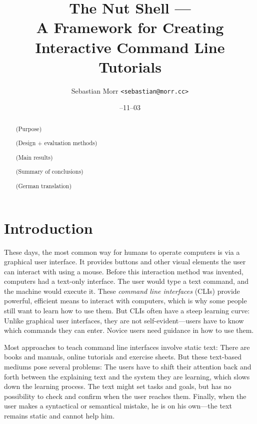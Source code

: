 \documentclass[paper=a4,twoside,abstract=on,cleardoublepage=empty,numbers=noenddot,toc=bib,12pt,appendixprefix=true]{scrreprt}
\title{The Nut Shell ---\\A Framework for Creating\\Interactive Command Line Tutorials}
\author{\sffamily Sebastian Morr \texttt{<sebastian@morr.cc>}}
\date{\sffamily 2013--11--03}
\begin{document}
\maketitle
\restoregeometry


\begin{abstract}
    (Purpose)

    (Design + evaluation methods)

    (Main results)

    (Summary of conclusions)
\end{abstract}

%
\begin{abstract}
    (German translation)
\end{abstract}
%

\setcounter{tocdepth}{2}
\tableofcontents

\chapter{Introduction}

These days, the most common way for humans to operate computers is via a graphical user interface. It provides buttons and other visual elements the user can interact with using a mouse. Before this interaction method was invented, computers had a text-only interface. The user would type a text command, and the machine would execute it. These \emph{command line interfaces} (CLIs) provide powerful, efficient means to interact with computers, which is why some people still want to learn how to use them. But CLIs often have a steep learning curve: Unlike graphical user interfaces, they are not self-evident---users have to know which commands they can enter. Novice users need guidance in how to use them.

Most approaches to teach command line interfaces involve static text: There are books and manuals, online tutorials and exercise sheets. But these text-based mediums pose several problems: The users have to shift their attention back and forth between the explaining text and the system they are learning, which slows down the learning process. The text might set tasks and goals, but has no possibility to check and confirm when the user reaches them. Finally, when the user makes a syntactical or semantical mistake, he is on his own---the text remains static and cannot help him.
\end{document}
